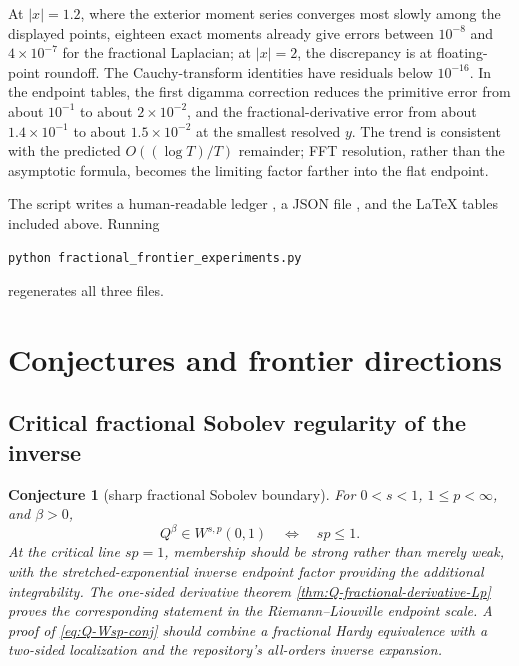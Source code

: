 \documentclass[11pt,oneside]{article}
\newtheorem{conjecture}[theorem]{Conjecture}
\theoremstyle{definition}
\newcommand{\Q}{Q}
\begin{document}


At \(|x|=1.2\), where the exterior moment series converges most slowly among the
displayed points, eighteen exact moments already give errors between
\(10^{-8}\) and \(4\times10^{-7}\) for the fractional Laplacian; at \(|x|=2\),
the discrepancy is at floating-point roundoff.  The Cauchy-transform identities have
residuals below \(10^{-16}\).  In the endpoint tables, the first digamma correction
reduces the primitive error from about \(10^{-1}\) to about \(2\times10^{-2}\), and
the fractional-derivative error from about \(1.4\times10^{-1}\) to about
\(1.5\times10^{-2}\) at the smallest resolved \(y\).  The trend is consistent with
the predicted \(O((\log T)/T)\) remainder; FFT resolution, rather than the asymptotic
formula, becomes the limiting factor farther into the flat endpoint.

The script writes a human-readable ledger , a JSON file
, and the LaTeX tables included above.  Running
\begin{verbatim}
python fractional_frontier_experiments.py
\end{verbatim}
regenerates all three files.


\section{Conjectures and frontier directions}

\subsection{Critical fractional Sobolev regularity of the inverse}

\begin{conjecture}[sharp fractional Sobolev boundary]\label{conj:Q-Wsp}
For \(0<s<1\), \(1\le p<\infty\), and \(\beta>0\),
\begin{equation}\label{eq:Q-Wsp-conj}
 \Q^\beta\in W^{s,p}(0,1)
 \quad\Longleftrightarrow\quad sp\le1.
\end{equation}
At the critical line \(sp=1\), membership should be strong rather than merely weak,
with the stretched-exponential inverse endpoint factor providing the additional
integrability.  The one-sided derivative theorem
\cref{thm:Q-fractional-derivative-Lp} proves the corresponding statement in the
Riemann--Liouville endpoint scale.  A proof of \eqref{eq:Q-Wsp-conj} should combine a
fractional Hardy equivalence with a two-sided localization and the repository's
all-orders inverse expansion.
\end{conjecture}
\end{document}
